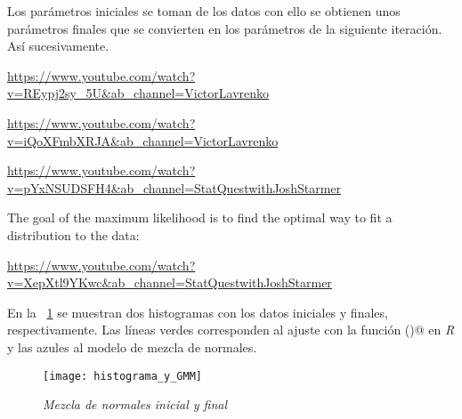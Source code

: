 Los parámetros iniciales se toman de los datos con ello se obtienen unos parámetros finales que se convierten en los parámetros de la siguiente iteración. Así sucesivamente.

\url{https://www.youtube.com/watch?v=REypj2sy_5U&ab_channel=VictorLavrenko}

\url{https://www.youtube.com/watch?v=iQoXFmbXRJA&ab_channel=VictorLavrenko}

\url{https://www.youtube.com/watch?v=pYxNSUDSFH4&ab_channel=StatQuestwithJoshStarmer}


 The goal of the maximum likelihood is to find the optimal way to fit a distribution to the data:
 
\url{https://www.youtube.com/watch?v=XepXtl9YKwc&ab_channel=StatQuestwithJoshStarmer}



En la \figurename{~\ref{GMM_inicial_final}} se muestran dos histogramas con los datos iniciales y finales, respectivamente. Las líneas verdes corresponden al ajuste con la función \verb@density()@ en \textit{R} y las azules al modelo de mezcla de normales.

\begin{figure}[H]
\centering
\texttt{[image: histograma\_y\_GMM]} %
\caption{\textit{Mezcla de normales inicial y final}}\label{GMM_inicial_final}
\end{figure}



%
%
%
%
%
%


